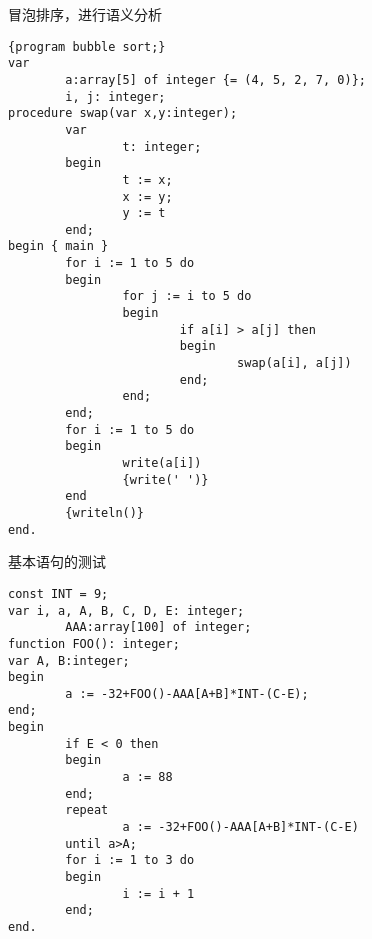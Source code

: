 冒泡排序，进行语义分析
\begin{verbatim}
{program bubble sort;}
var
        a:array[5] of integer {= (4, 5, 2, 7, 0)};
        i, j: integer;
procedure swap(var x,y:integer);
        var
                t: integer;
        begin
                t := x;
                x := y;
                y := t
        end;
begin { main }
        for i := 1 to 5 do
        begin
                for j := i to 5 do
                begin
                        if a[i] > a[j] then
                        begin
                                swap(a[i], a[j])
                        end;
                end;
        end;
        for i := 1 to 5 do
        begin
                write(a[i])
                {write(' ')}
        end
        {writeln()}
end.
\end{verbatim}
基本语句的测试
\begin{verbatim}
const INT = 9;
var i, a, A, B, C, D, E: integer;
        AAA:array[100] of integer;
function FOO(): integer;
var A, B:integer;
begin
        a := -32+FOO()-AAA[A+B]*INT-(C-E);
end;
begin
        if E < 0 then
        begin
                a := 88
        end;
        repeat
                a := -32+FOO()-AAA[A+B]*INT-(C-E)
        until a>A;
        for i := 1 to 3 do
        begin
                i := i + 1
        end;
end.
\end{verbatim}
